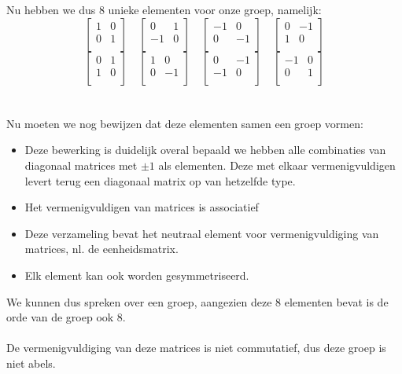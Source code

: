 \documentclass[11pt,a4paper,titlepage]{article}
\begin{document}
Nu hebben we dus 8 unieke elementen voor onze groep, namelijk:
\[
\begin{bmatrix}
    	1 & 0 \\
	0 & 1 \\
\end{bmatrix}
\quad
\begin{bmatrix}
    	0 & 1 \\
	-1 & 0 \\
\end{bmatrix}
\quad
\begin{bmatrix}
    	-1 & 0 \\
	0 & -1 \\
\end{bmatrix}
\quad
\begin{bmatrix}
    	0 & -1 \\
	1 & 0 \\
\end{bmatrix}
\]
\[
\begin{bmatrix}
    	0 & 1 \\
	1 & 0 \\
\end{bmatrix}
\quad
\begin{bmatrix}
    	1 & 0 \\
	0 & -1 \\
\end{bmatrix}
\quad
\begin{bmatrix}
    	0 & -1 \\
	-1 & 0 \\
\end{bmatrix}
\quad
\begin{bmatrix}
    	-1 & 0 \\
	0 & 1 \\
\end{bmatrix}
\]
\\ \\Nu moeten we nog bewijzen dat deze elementen samen een groep vormen:
\begin{itemize}
	\item Deze bewerking is duidelijk overal bepaald we hebben alle combinaties van diagonaal matrices met $\pm 1$ als elementen. Deze met elkaar vermenigvuldigen levert terug een diagonaal matrix op van hetzelfde type.
	\item Het vermenigvuldigen van matrices is associatief
	\item Deze verzameling bevat het neutraal element voor vermenigvuldiging van matrices, nl. de eenheidsmatrix.
	\item Elk element kan ook worden gesymmetriseerd.
\end{itemize}
We kunnen dus spreken over een groep, aangezien deze 8 elementen bevat is de orde van de groep ook 8.\\ \\
De vermenigvuldiging van deze matrices is niet commutatief, dus deze groep is niet abels.
\end{document}
